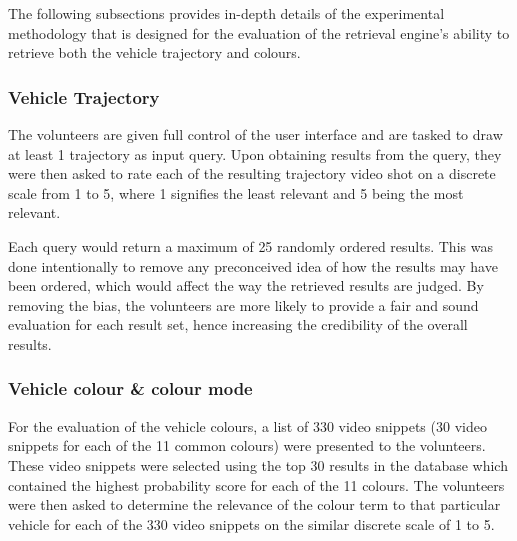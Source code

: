 The following subsections provides in-depth details of the experimental methodology that is designed for the evaluation of the retrieval engine's ability to retrieve both the vehicle trajectory and colours.

\subsubsection{Vehicle Trajectory}
The volunteers are given full control of the user interface and are tasked to draw at least 1 trajectory as input query. Upon obtaining results from the query, they were then asked to rate each of the resulting trajectory video shot on a discrete scale from 1 to 5, where 1 signifies the least relevant and 5 being the most relevant.

Each query would return a maximum of 25 randomly ordered results. This was done intentionally to remove any preconceived idea of how the results may have been ordered, which would affect the way the retrieved results are judged. By removing the bias, the volunteers are more likely to provide a fair and sound evaluation for each result set, hence increasing the credibility of the overall results.

\subsubsection{Vehicle colour \& colour mode}
\label{subsec:vehColor}
For the evaluation of the vehicle colours, a list of 330 video snippets (30 video snippets for each of the 11 common colours) were presented to the volunteers. These video snippets were selected using the top 30 results in the database which contained the highest probability score for each of the 11
colours. The volunteers were then asked to determine the relevance of the colour term to that particular vehicle for each of the 330 video snippets on the similar discrete scale of 1 to 5.

